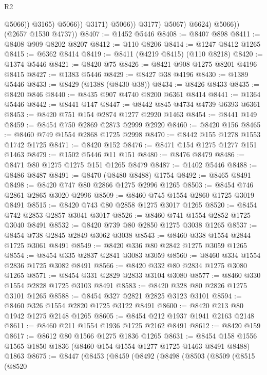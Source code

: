 \begin{lexlean}{R2}
\begin{coremodule}
                                @5066))
                            @3165)
                          @5066))
                      @3171)
                    @5066))
                @3177)
              @5067)
            @6624)
          @5066))
      (@2657 @1530 @4737))
@8407 := @1452 @5446
@8408 := @8407 @898
@8411 := @8408 @909 @8202 @8207
@8412 := @110 @8206
@8414 := @1247 @8412 @1265
@8415 := @6362 @8414
@8419 := @8411 (@4219 @8415) (@110 @8218)
@8420 := @1374 @5446
@8421 := @8420 @75
@8426 := @8421 @908 @1275 @8201 @4196 @8415
@8427 := @1383 @5446
@8429 := @8427 @38 @4196
@8430 := @1389 @5446
@8433 := @8429 (@1388 (@8430 @38))
@8434 := @8426 @8433
@8435 := @8420 @846
@8440 := @8435 @907 @4740 @8200 @6361 @8414
@8441 := @1364 @5446
@8442 := @8441 @147
@8447 := @8442 @845 @4734 @4739 @6393 @6361
@8453 := @8420 @751 @154 @2874 @1277 @2920 @1463
@8454 := @8441 @149
@8459 := @8454 @750 @2869 @2873 @2999 @2920
@8460 := @8420 @156
@8465 := @8460 @749 @1554 @2868 @1725 @2998
@8470 := @8442 @155 @1278 @1553 @1742 @1725
@8471 := @8420 @152
@8476 := @8471 @154 @1275 @1277 @151 @1463
@8479 := @1502 @5446 @11 @151
@8480 := @8476 @8479
@8486 := @8471 @80 @1275 @1275 @151 @1265 @8479
@8487 := @1402 @5446
@8488 := @8486 @8487
@8491 := @8470 (@8480 @8488) @1754
@8492 := @8465 @8491
@8498 := @8420 @747 @80 @2866 @1275 @2996 @1265
@8503 := @8454 @746 @2861 @2865 @3020 @2996
@8509 := @8460 @745 @1554 @2860 @1725 @3019 @8491
@8515 := @8420 @743 @80 @2858 @1275 @3017 @1265
@8520 := @8454 @742 @2853 @2857 @3041 @3017
@8526 := @8460 @741 @1554 @2852 @1725 @3040 @8491
@8532 := @8420 @739 @80 @2850 @1275 @3038 @1265
@8537 := @8454 @738 @2845 @2849 @3062 @3038
@8543 := @8460 @338 @1554 @2844 @1725 @3061 @8491
@8549 := @8420 @336 @80 @2842 @1275 @3059 @1265
@8554 := @8454 @335 @2837 @2841 @3083 @3059
@8560 := @8460 @334 @1554 @2836 @1725 @3082 @8491
@8566 := @8420 @332 @80 @2834 @1275 @3080 @1265
@8571 := @8454 @331 @2829 @2833 @3104 @3080
@8577 := @8460 @330 @1554 @2828 @1725 @3103 @8491
@8583 := @8420 @328 @80 @2826 @1275 @3101 @1265
@8588 := @8454 @327 @2821 @2825 @3123 @3101
@8594 := @8460 @326 @1554 @2820 @1725 @3122 @8491
@8600 := @8420 @213 @80 @1942 @1275 @2148 @1265
@8605 := @8454 @212 @1937 @1941 @2163 @2148
@8611 := @8460 @211 @1554 @1936 @1725 @2162 @8491
@8612 := @8420 @159
@8617 := @8612 @80 @1566 @1275 @1836 @1265
@8631 := @8454 @158 @1556 @1565 @1850 @1836 (@8460 @154 @1554 @1277 @1725 @1463 @8491 @8488) @1863
@8675 := @8447
    (@8453
      (@8459
        (@8492
          (@8498
            (@8503
              (@8509
                (@8515
                  (@8520

\end{coremodule}
\end{lexlean}
